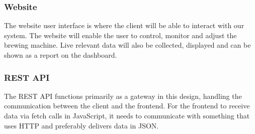 \subsubsection{Website}
The website user interface is where the client will be able to interact with
our system. The website will enable the user to control, monitor and adjust
the brewing machine. Live relevant data will also be collected, displayed and
can be shown as a report on the dashboard.


\subsubsection{REST API}
The REST API functions primarily as a gateway in this design, handling the
communication between the client and the frontend. For the
frontend to receive data via fetch calls in JavaScript, it needs to communicate 
with something that uses HTTP and preferably delivers data in JSON.


